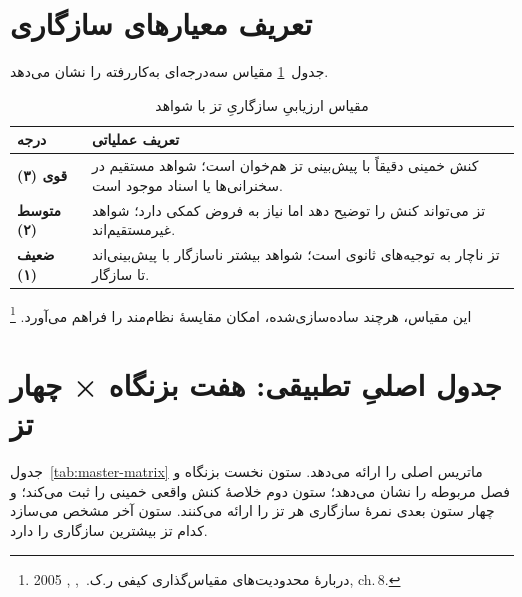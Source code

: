 \section{تعریف معیارهای سازگاری}
\label{sec:ch13-criteria}

جدول~\ref{tab:fit-scale} مقیاس سه‌درجه‌ای به‌کاررفته را نشان می‌دهد.

\begin{table}[ht]
\centering
\caption{مقیاس ارزیابیِ سازگاریِ تز با شواهد}
\label{tab:fit-scale}
\begin{tabular}{>{\centering\arraybackslash}m{2.8cm}
                >{\arraybackslash}m{9.5cm}}
\toprule
\textbf{درجه} & \textbf{تعریف عملیاتی} \\
\midrule
\cellcolor{cGreen!15}\textbf{قوی (۳)}
  & کنش خمینی دقیقاً با پیش‌بینی تز هم‌خوان است؛
    شواهد مستقیم در سخنرانی‌ها یا اسناد موجود است. \\
\addlinespace
\cellcolor{cGold!15}\textbf{متوسط (۲)}
  & تز می‌تواند کنش را توضیح دهد اما نیاز به فروض کمکی دارد؛
    شواهد غیرمستقیم‌اند. \\
\addlinespace
\cellcolor{cAccent!15}\textbf{ضعیف (۱)}
  & تز ناچار به توجیه‌های ثانوی است؛
    شواهد بیشتر ناسازگار با پیش‌بینی‌اند تا سازگار. \\
\bottomrule
\end{tabular}
\end{table}

این مقیاس، هرچند ساده‌سازی‌شده،
امکان مقایسهٔ نظام‌مند را فراهم می‌آورد.%
\footnote{%
دربارهٔ محدودیت‌های مقیاس‌گذاری کیفی
ر.ک.\ ,
\textit{},
2005, ch.\,8.}

\section{جدول اصلیِ تطبیقی: هفت بزنگاه × چهار تز}
\label{sec:ch13-master}

جدول~\ref{tab:master-matrix} ماتریس اصلی را ارائه می‌دهد.
ستون نخست بزنگاه و فصل مربوطه را نشان می‌دهد؛
ستون دوم خلاصهٔ کنش واقعی خمینی را ثبت می‌کند؛
و چهار ستون بعدی نمرهٔ سازگاری هر تز را ارائه می‌کنند.
ستون آخر مشخص می‌سازد کدام تز بیشترین سازگاری را دارد.

